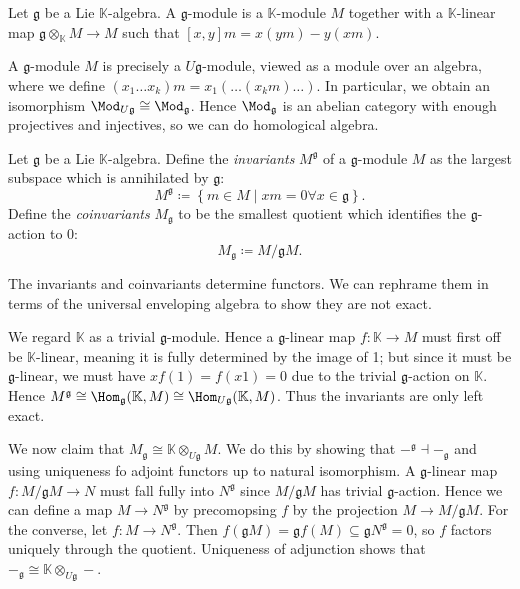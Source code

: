 \begin{definition}\label{3.2.4}
	Let $\mathfrak{g} $ be a Lie $\mathbb{K} $-algebra. A $\mathfrak{g} $-module is a $\mathbb{K} $-module $M$ together with a $\mathbb{K} $-linear map $\mathfrak{g} \otimes _\mathbb{K} M\to M$ such that $[x,y]m=x(ym)-y(xm)$.
\end{definition}

\begin{remark}\label{3.2.5}
	A $\mathfrak{g} $-module $M$ is precisely a $U\mathfrak{g} $-module, viewed as a module over an algebra, where we define $(x_1 \ldots x_k)m=x_1( \ldots (x_km)\ldots )$. In particular, we obtain an isomorphism $\Mod _{U\mathfrak{g} } \cong \Mod _\mathfrak{g} $. Hence $\Mod _{\mathfrak{g} } $ is an abelian category with enough projectives and injectives, so we can do homological algebra.
\end{remark}

\begin{definition}\label{3.2.6}
	Let $\mathfrak{g} $ be a Lie $\mathbb{K} $-algebra. Define the \emph{invariants} $M^\mathfrak{g} $ of a $\mathfrak{g} $-module $M$ as the largest subspace which is annihilated by $\mathfrak{g} $:
	\[
		M^\mathfrak{g} \coloneqq \left\{ m\in M\mid xm=0\forall x\in \mathfrak{g}  \right\} 
	.\]
	Define the \emph{coinvariants} $M_\mathfrak{g} $ to be the smallest quotient which identifies the $\mathfrak{g} $-action to 0:
	\[
		M_\mathfrak{g} \coloneqq M / \mathfrak{g} M
	.\]
\end{definition}

The invariants and coinvariants determine functors. We can rephrame them in terms of the universal enveloping algebra to show they are not exact.

\begin{remark}\label{3.2.7}
	We regard $\mathbb{K} $ as a trivial $\mathfrak{g} $-module. Hence a $\mathfrak{g} $-linear map $f : \mathbb{K}\to M $ must first off be $\mathbb{K} $-linear, meaning it is fully determined by the image of 1; but since it must be $\mathfrak{g} $-linear, we must have $xf(1) = f(x1) = 0$ due to the trivial $\mathfrak{g} $-action on $\mathbb{K} $. Hence $M^\mathfrak{g} \cong \Hom_\mathfrak{g} (\mathbb{K} ,M) \cong \Hom_{U\mathfrak{g} } (\mathbb{K} ,M)$. Thus the invariants are only left exact.
\end{remark}

\begin{remark}\label{3.2.8}
	We now claim that $M_\mathfrak{g} \cong \mathbb{K} \otimes _{U\mathfrak{g} } M$. We do this by showing that $-^\mathfrak{g} \dashv -_\mathfrak{g} $ and using uniqueness fo adjoint functors up to natural isomorphism. A $\mathfrak{g} $-linear map $f : M / \mathfrak{g} M\to N$ must fall fully into $N^\mathfrak{g} $ since $M / \mathfrak{g} M$ has trivial $\mathfrak{g} $-action. Hence we can define a map $M \to N^\mathfrak{g} $ by precomopsing $f$ by the projection $M \to M/\mathfrak{g} M$. For the converse, let $f : M \to N^\mathfrak{g} $. Then $f(\mathfrak{g} M)=\mathfrak{g} f(M)\subseteq \mathfrak{g} N^\mathfrak{g} =0$, so $f$ factors uniquely through the quotient. Uniqueness of adjunction shows that $-_\mathfrak{g} \cong \mathbb{K} \otimes _{U\mathfrak{g} } -$.
\end{remark}



